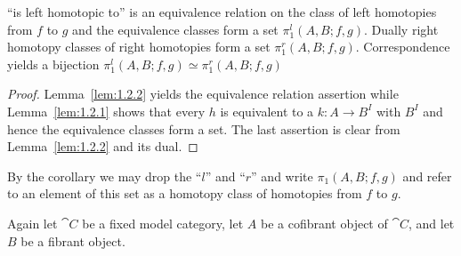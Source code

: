\documentclass[../main]{subfiles}
\begin{document}
\begin{corollary*}
    ``is left homotopic to'' is an equivalence relation on the class of left homotopies from $f$ to $g$ and the equivalence classes form a set $\pi_1^{l}(A, B;f,g)$. Dually right homotopy classes of right homotopies form a set $\pi_1^{r}(A,B; f,g)$. Correspondence yields a bijection $\pi_1^{l}(A,B; f,g) \simeq \pi_1^{r}(A,B; f,g)$
\end{corollary*}

\begin{proof}
    Lemma~\ref{lem:1.2.2} yields the equivalence relation assertion while Lemma~\ref{lem:1.2.1} shows that every $h$ is equivalent to a $k \colon A \longrightarrow B^I$ with  $B^I$ and hence the equivalence classes form a set. The last assertion is clear from Lemma~\ref{lem:1.2.2} and its dual.
\end{proof}

By the corollary we may drop the ``$l$'' and ``$r$'' and write $\pi_1(A,B;f,g)$ and refer to an element of this set as a homotopy class of homotopies from $f$ to $g$. 

Again let $\cat{C}$ be a fixed model category, let $A$ be a cofibrant object of $\cat{C}$, and let $B$ be a fibrant object.
\end{document}
